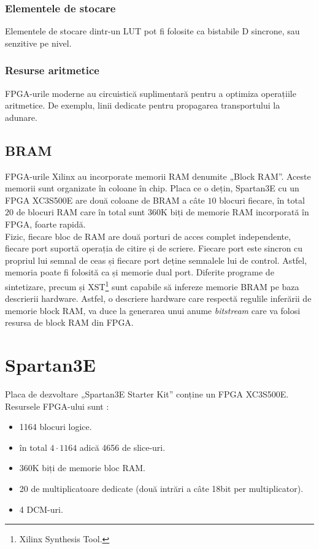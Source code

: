 \documentclass[12pt,twoside,a4paper,fleqn]{book}
\theoremstyle{definition}
\begin{document}
\subsubsection{Elementele de stocare}
Elementele de stocare dintr-un LUT pot fi folosite ca bistabile D sincrone, sau senzitive pe nivel.
\subsubsection{Resurse aritmetice}
FPGA-urile moderne au circuistică suplimentară pentru a optimiza operațiile aritmetice. De exemplu, linii dedicate pentru propagarea transportului la adunare.

\subsection{BRAM}
\label{bram}
FPGA-urile Xilinx au incorporate memorii RAM denumite „Block RAM”. Aceste memorii sunt organizate în coloane în chip. Placa ce o dețin, Spartan3E cu un FPGA XC3S500E are două coloane de BRAM a câte $10$ blocuri fiecare, în total $20$ de blocuri RAM care în total sunt 360K biți de memorie RAM incorporată în FPGA, foarte rapidă.\cite{xilinx_ug331}\\
Fizic, fiecare bloc de RAM are două porturi de acces complet independente, fiecare port suportă operația de citire și de scriere. Fiecare port este sincron cu propriul lui semnal de ceas și fiecare port deține semnalele lui de control. Astfel, memoria poate fi folosită ca și memorie dual port. Diferite programe de sintetizare, precum și XST\footnote{Xilinx Synthesis Tool.} sunt capabile să infereze memorie BRAM pe baza descrierii hardware. Astfel, o descriere hardware care respectă regulile inferării de memorie block RAM, va duce la generarea unui anume \emph{bitstream} care va folosi resursa de block RAM din FPGA. \cite{xilinx_ug331}


\section{Spartan3E}
\label{placa}
Placa de dezvoltare „Spartan3E Starter Kit” conține un FPGA XC3S500E.\\
Resursele FPGA-ului sunt \cite{xilinx_spartan_datasheet}:
\begin{itemize}
\item 1164 blocuri logice.
\item în total $4 \cdot 1164$ adică 4656 de slice-uri.
\item 360K biți de memorie bloc RAM.
\item 20 de multiplicatoare dedicate (două intrări a câte 18bit per multiplicator).
\item 4 DCM-uri.
\end{itemize}
\end{document}
